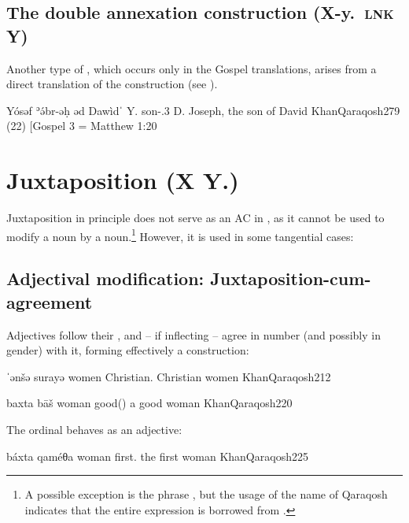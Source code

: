 \subsection{The double annexation construction (X-y.\poss\ \textsc{lnk} Y)} \label{ss:Qar_DAC}



Another type of , which occurs only in the Gospel translations, arises from a direct translation of the \Syr {} construction (see ).

{Yósəf ʾə́br-əḥ əd\cb{} Dawìdˈ}
{Y. son-\poss.3\masc{} \lnk\cb{} D.}
{Joseph, the son of David}
{KhanQaraqosh}{279 (22) [Gospel 3 = Matthew 1:20}\antipar









\section{Juxtaposition (X Y.\opt{\agr})} \label{ss:Qar_juxt}

Juxtaposition in principle does not serve as an AC in \Qar, as it cannot be used to modify a noun by a noun.\footnote{A possible exception is the phrase  \citep[3; 643 (83)]{KhanQaraqosh}, but the usage of the  name of Qaraqosh indicates that the entire expression is borrowed from .} 
 However, it is used in some tangential cases:

\subsection{Adjectival modification: Juxtaposition-cum-agreement}

Adjectives follow their \prim, and -- if inflecting -- agree in number (and possibly in gender) with it, forming effectively a  construction:

{ˈənšə surayə}
{women Christian.\pl{}}
{Christian women}
{KhanQaraqosh}{212}

{baxta bāš}
{woman good(\invar)}
{a good woman}
{KhanQaraqosh}{220}

The ordinal  behaves as an adjective:

{báxta qaméθa}
{woman first.\fem}
{the first woman}
{KhanQaraqosh}{225}


